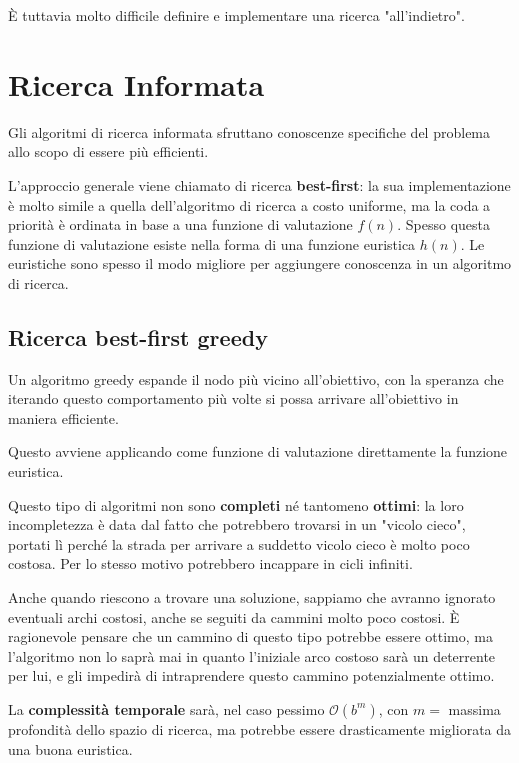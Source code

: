             È tuttavia molto difficile definire e implementare una ricerca "all'indietro".
            
\section{Ricerca Informata}
    Gli algoritmi di ricerca informata sfruttano conoscenze specifiche del problema allo scopo di essere più efficienti.
    
    L'approccio generale viene chiamato di ricerca \textbf{best-first}: la sua implementazione è molto simile a quella dell'algoritmo di ricerca a costo uniforme, ma la coda a priorità è ordinata in base a una funzione di valutazione $f(n)$. Spesso questa funzione di valutazione esiste nella forma di una funzione euristica $h(n)$. Le euristiche sono spesso il modo migliore per aggiungere conoscenza in un algoritmo di ricerca.
    
    \subsection{Ricerca best-first greedy}
        Un algoritmo greedy espande il nodo più vicino all'obiettivo, con la speranza che iterando questo comportamento più volte si possa arrivare all'obiettivo in maniera efficiente.
        
        Questo avviene applicando come funzione di valutazione direttamente la funzione euristica.
        
        Questo tipo di algoritmi non sono \textbf{completi} né tantomeno \textbf{ottimi}: la loro incompletezza è data dal fatto che potrebbero trovarsi in un "vicolo cieco", portati lì perché la strada per arrivare a suddetto vicolo cieco è molto poco costosa. Per lo stesso motivo potrebbero incappare in cicli infiniti.
        
        Anche quando riescono a trovare una soluzione, sappiamo che avranno ignorato eventuali archi costosi, anche se seguiti da cammini molto poco costosi. È ragionevole pensare che un cammino di questo tipo potrebbe essere ottimo, ma l'algoritmo non lo saprà mai in quanto l'iniziale arco costoso sarà un deterrente per lui, e gli impedirà di intraprendere questo cammino potenzialmente ottimo.
        
        La \textbf{complessità temporale} sarà, nel caso pessimo $\mathcal{O}(b^m)$, con $m = $ massima profondità dello spazio di ricerca, ma potrebbe essere drasticamente migliorata da una buona euristica.
        
